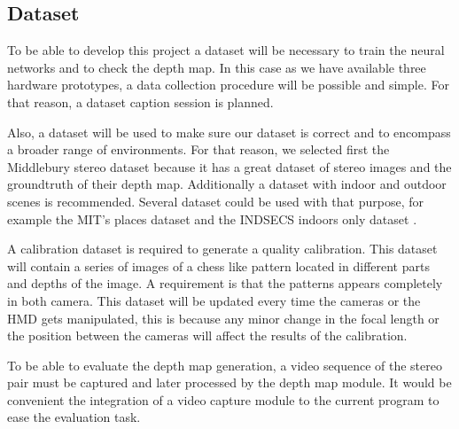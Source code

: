 \documentclass[10pt,a4paper,twocolumn,twoside]{article}
\begin{document}
	\subsection{Dataset}
	\label{subsec:dataset}
	To be able to develop this project a dataset will be necessary to train the neural networks and to check the depth map. In this case as we have available three hardware prototypes, a data collection procedure will be possible and simple. For that reason, a dataset caption session is planned.
	
	Also, a dataset will be used to make sure our dataset is correct and to encompass a broader range of environments. For that reason, we selected first the Middlebury stereo dataset \cite{web:middelburyDataset} because it has a great dataset of stereo images and the groundtruth of their depth map. Additionally a dataset with indoor and outdoor scenes is recommended. Several dataset could be used with that purpose, for example the MIT's places dataset \cite{web:mitplaces} and the INDSECS indoors only dataset \cite{web:indecs}.
	
	A calibration dataset is required to generate a quality calibration. This dataset will contain a series of images of a chess like pattern located in different parts and depths of the image. A requirement is that the patterns appears completely in both camera. This dataset will be updated every time the cameras or the HMD gets manipulated, this is because any minor change in the focal length or the position between the cameras will affect the results of the calibration.
	
	To be able to evaluate the depth map generation, a video sequence of the stereo pair must be captured and later processed by the depth map module. It would be convenient the integration of a video capture module to the current program to ease the evaluation task.
	
	
\end{document}
